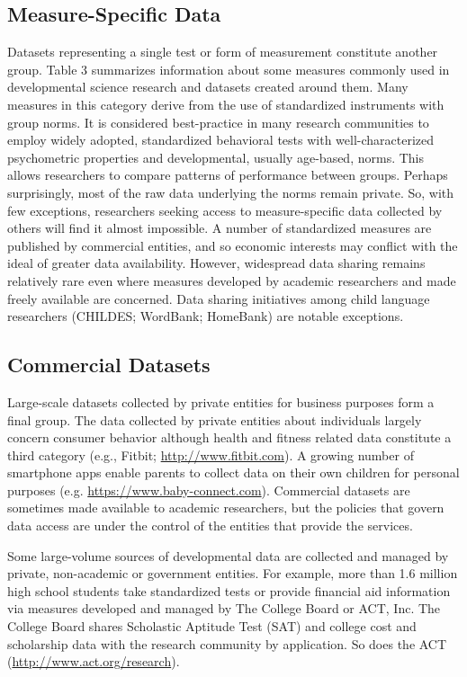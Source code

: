 \documentclass[letterpaper,man,apacite,natbib]{apa6}
\begin{document}
\subsection{Measure-Specific Data}
Datasets representing a single test or form of measurement constitute another group.
Table 3 summarizes information about some measures commonly used in developmental science research and datasets created around them.
Many measures in this category derive from the use of standardized instruments with group norms.
It is considered best-practice in many research communities to employ widely adopted, standardized behavioral tests with well-characterized psychometric properties and developmental, usually age-based, norms.
This allows researchers to compare patterns of performance between groups.
Perhaps surprisingly, most of the raw data underlying the norms remain private.
So, with few exceptions, researchers seeking access to measure-specific data collected by others will find it almost impossible.
A number of standardized measures are published by commercial entities, and so economic interests may conflict with the ideal of greater data availability.
However, widespread data sharing remains relatively rare even where measures developed by academic researchers and made freely available are concerned.
Data sharing initiatives among child language researchers (CHILDES; WordBank; HomeBank) are notable exceptions.

\subsection{Commercial Datasets}
Large-scale datasets collected by private entities for business purposes form a final group.
The data collected by private entities about individuals largely concern consumer behavior although health and fitness related data constitute a third category (e.g., Fitbit; \url{http://www.fitbit.com}).
A growing number of smartphone apps enable parents to collect data on their own children for personal purposes (e.g. \url{https://www.baby-connect.com}).
Commercial datasets are sometimes made available to academic researchers, but the policies that govern data access are under the control of the entities that provide the services.

Some large-volume sources of developmental data are collected and managed by private, non-academic or government entities.
For example, more than 1.6 million high school students \cite{lewin_more_2013} take standardized tests or provide financial aid information via measures developed and managed by The College Board or ACT, Inc.
The College Board shares Scholastic Aptitude Test (SAT) and college cost and scholarship data with the research community by application.
So does the ACT (\url{http://www.act.org/research}).
\end{document}
